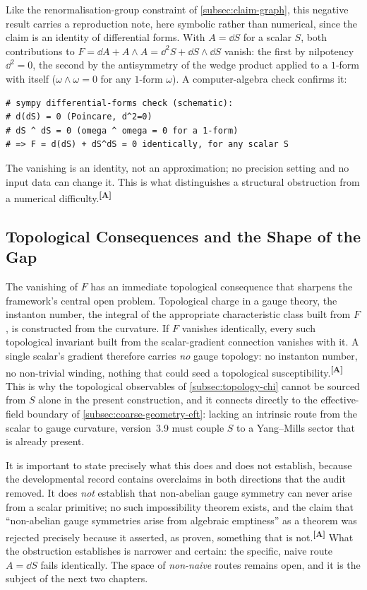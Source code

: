 \documentclass[12pt,a4paper,twoside]{article}
\theoremstyle{plain}
\theoremstyle{definition}
\theoremstyle{remark}
\newcommand{\catmark}[1]{\textsuperscript{\textsf{\textbf{[#1]}}}}
\begin{document}
\noindent Like the renormalisation-group constraint of \cref{subsec:claim-graph}, this negative result carries a reproduction note, here symbolic rather than numerical, since the claim is an identity of differential forms. With $A=\dd S$ for a scalar $S$, both contributions to $F = \dd A + A\wedge A = \dd^2 S + \dd S \wedge \dd S$ vanish: the first by nilpotency $\dd^2=0$, the second by the antisymmetry of the wedge product applied to a $1$-form with itself ($\omega\wedge\omega=0$ for any $1$-form $\omega$). A computer-algebra check confirms it:
\begin{verbatim}
# sympy differential-forms check (schematic):
# d(dS) = 0 (Poincare, d^2=0)
# dS ^ dS = 0 (omega ^ omega = 0 for a 1-form)
# => F = d(dS) + dS^dS = 0 identically, for any scalar S
\end{verbatim}
The vanishing is an identity, not an approximation; no precision setting and no input data can change it. This is what distinguishes a structural obstruction from a numerical difficulty.\catmark{A}

\subsection{Topological Consequences and the Shape of the Gap}
\label{subsec:topological-consequences}

The vanishing of $F$ has an immediate topological consequence that sharpens the framework's central open problem. Topological charge in a gauge theory, the instanton number, the integral of the appropriate characteristic class built from $F$, is constructed from the curvature. If $F$ vanishes identically, every such topological invariant built from the scalar-gradient connection vanishes with it. A single scalar's gradient therefore carries \emph{no} gauge topology: no instanton number, no non-trivial winding, nothing that could seed a topological susceptibility.\catmark{A} This is why the topological observables of \cref{subsec:topology-chi} cannot be sourced from $S$ alone in the present construction, and it connects directly to the effective-field boundary of \cref{subsec:coarse-geometry-eft}: lacking an intrinsic route from the scalar to gauge curvature, version~3.9 must couple $S$ to a Yang--Mills sector that is already present.

It is important to state precisely what this does and does not establish, because the developmental record contains overclaims in both directions that the audit removed. It does \emph{not} establish that non-abelian gauge symmetry can never arise from a scalar primitive; no such impossibility theorem exists, and the claim that ``non-abelian gauge symmetries arise from algebraic emptiness'' as a theorem was rejected precisely because it asserted, as proven, something that is not.\catmark{A} What the obstruction establishes is narrower and certain: the specific, naive route $A = \dd S$ fails identically. The space of \emph{non-naive} routes remains open, and it is the subject of the next two chapters.
\end{document}

